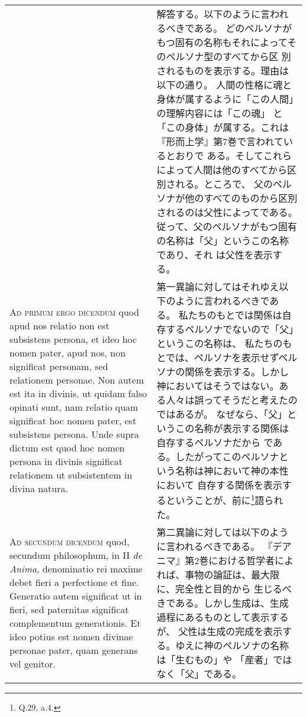 \documentclass[10pt]{jsarticle} %
\begin{document}
\begin{longtable}{p{21em}p{21em}}
&

解答する。以下のように言われるべきである。
どのペルソナがもつ固有の名称もそれによってそのペルソナ型のすべてから区
 別されるものを表示する。理由は以下の通り。
人間の性格に魂と身体が属するように「この人間」の理解内容には「この魂」
 と「この身体」が属する。これは『形而上学』第7巻で言われているとおりで
 ある。そしてこれらによって人間は他のすべてから区別される。ところで、
 父のペルソナが他のすべてのものから区別されるのは父性によってである。
従って、父のペルソナがもつ固有の名称は「父」というこの名称であり、それ
 は父性を表示する。

\\



{\scshape Ad primum ergo dicendum} quod apud nos relatio non est subsistens
persona, et ideo hoc nomen pater, apud nos, non significat personam,
sed relationem personae. Non autem est ita in divinis, ut quidam falso
opinati sunt, nam relatio quam significat hoc nomen pater, est
subsistens persona. Unde supra dictum est quod hoc nomen persona in
divinis significat relationem ut subsistentem in divina natura.

&

第一異論に対してはそれゆえ以下のように言われるべきである。
私たちのもとでは関係は自存するペルソナでないので「父」というこの名称は、
 私たちのもとでは、ペルソナを表示せずペルソナの関係を表示する。しかし
 神においてはそうではない。ある人々は誤ってそうだと考えたのではあるが。
 なぜなら、「父」というこの名称が表示する関係は自存するペルソナだから
 である。したがってこのペルソナという名称は神において神の本性において
 自存する関係を表示するということが、前に\footnote{Q.29, a.4.}語られた。


\\



{\scshape Ad secundum dicendum} quod, secundum philosophum, in II {\itshape de Anima},
denominatio rei maxime debet fieri a perfectione et fine. Generatio
autem significat ut in fieri, sed paternitas significat complementum
generationis. Et ideo potius est nomen divinae personae pater, quam
generans vel genitor.

&

第二異論に対しては以下のように言われるべきである。
『デアニマ』第2巻における哲学者によれば、事物の論証は、最大限に、完全性と目的から
 生じるべきである。しかし生成は、生成過程にあるものとして表示するが、
 父性は生成の完成を表示する。ゆえに神のペルソナの名称は「生むもの」や
 「産者」ではなく「父」である。



\end{longtable}
\end{document}
